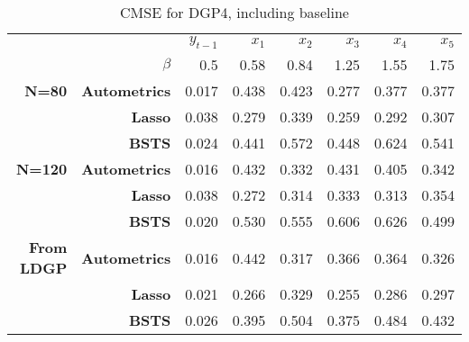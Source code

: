 \documentclass[11pt, oneside]{book}   	%
\begin{document}
\begin{table}[htbp]
  \centering

    \begin{tabular}{rrrrrrrr}

          &       & $y_{t-1}$ & $x_{1}$ & $x_{2}$ & $x_{3}$ & $x_{4}$ & $x_{5}$ \\

          & $\beta$ &   0.5 & 0.58 &0.84 &1.25 &  1.55 & 1.75  \\
    \textbf{N=80} & \textbf{Autometrics} & 0.017 & 0.438 & 0.423 & 0.277 & 0.377 & 0.377 \\
    \textbf{} & \textbf{Lasso} & 0.038 & 0.279 & 0.339 & 0.259 & 0.292 & 0.307 \\
    \textbf{} & \textbf{BSTS} & 0.024 & 0.441 & 0.572 & 0.448 & 0.624 & 0.541 \\
    \textbf{N=120} & \textbf{Autometrics} & 0.016 & 0.432 & 0.332 & 0.431 & 0.405 & 0.342 \\
    \textbf{} & \textbf{Lasso} & 0.038 & 0.272 & 0.314 & 0.333 & 0.313 & 0.354 \\
    \textbf{} & \textbf{BSTS} & 0.020 & 0.530 & 0.555 & 0.606 & 0.626 & 0.499 \\
    \textbf{From LDGP} & \textbf{Autometrics} & 0.016 & 0.442 & 0.317 & 0.366 & 0.364 & 0.326 \\
          & \textbf{Lasso} & 0.021 & 0.266 & 0.329 & 0.255 & 0.286 & 0.297 \\
          & \textbf{BSTS} & 0.026 & 0.395 & 0.504 & 0.375 & 0.484 & 0.432 \\

    \end{tabular}%
      \caption{CMSE for DGP4, including baseline}
  \label{DGP4CMSE}%
\end{table}%
\end{document}
